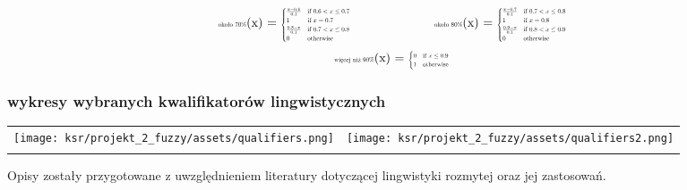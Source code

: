 \documentclass{article}
\begin{document}
\[
\begin{minipage}{0.5\textwidth}
\centering
\text{\scalebox{0.5}{około 70\%}}(x) = \scalebox{0.5}{$
\begin{cases} 
\frac{x - 0.6}{0.1} & \text{if } 0.6 < x \leq 0.7 \\
1 & \text{if } x = 0.7 \\
\frac{0.8 - x}{0.1} & \text{if } 0.7 < x \leq 0.8 \\
0 & \text{otherwise}
\end{cases}
$}
\end{minipage}%
\begin{minipage}{0.5\textwidth}
\centering
\text{\scalebox{0.5}{około 80\%}}(x) = \scalebox{0.5}{$
\begin{cases} 
\frac{x - 0.7}{0.1} & \text{if } 0.7 < x \leq 0.8 \\
1 & \text{if } x = 0.8 \\
\frac{0.9 - x}{0.1} & \text{if } 0.8 < x \leq 0.9 \\
0 & \text{otherwise}
\end{cases}
$}
\end{minipage}
\]
\[
\begin{minipage}{0.5\textwidth}
\centering
\text{\scalebox{0.5}{więcej niż 90\%}}(x) = \scalebox{0.5}{$
\begin{cases} 
0 & \text{if } x \leq 0.9 \\
1 & \text{otherwise}
\end{cases}
$}
\end{minipage}
\]


\subsubsection{wykresy wybranych kwalifikatorów lingwistycznych}


\begin{table}[H]
\centering
\begin{tabular}{cc}
    \texttt{[image: ksr/projekt\_2\_fuzzy/assets/qualifiers.png]} &
    \texttt{[image: ksr/projekt\_2\_fuzzy/assets/qualifiers2.png]} \\
     \\
\end{tabular}
\label{fig:two_images}
\end{table}


Opisy zostały przygotowane z uwzględnieniem literatury dotyczącej lingwistyki rozmytej oraz jej zastosowań.
\end{document}
